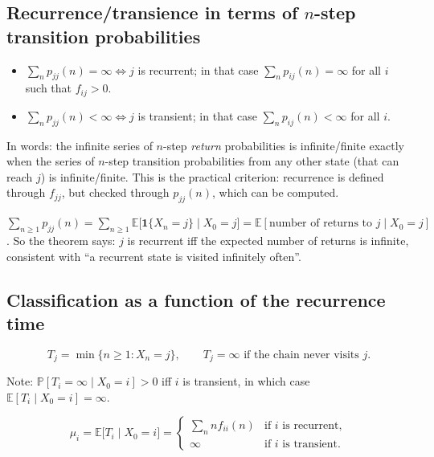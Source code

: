 \subsection{Recurrence/transience in terms of $n$-step transition probabilities}

\begin{theorem}
\begin{itemize}
    \item $\sum_n p_{jj}(n) = \infty \iff j$ is recurrent; in that case $\sum_n p_{ij}(n) = \infty$ for all $i$ such that $f_{ij} > 0$.
    \item $\sum_n p_{jj}(n) < \infty \iff j$ is transient; in that case $\sum_n p_{ij}(n) < \infty$ for all $i$.
\end{itemize}
\end{theorem}

In words: the infinite series of $n$-step \emph{return} probabilities is infinite/finite exactly when the series of $n$-step transition probabilities from any other state (that can reach $j$) is infinite/finite. This is the practical criterion: recurrence is defined through $f_{jj}$, but checked through $p_{jj}(n)$, which can be computed.

\begin{remark}[Interpretation]
$\sum_{n\geq1} p_{jj}(n) = \sum_{n \geq 1}\mathbb{E}\big[\mathbf{1}\{X_n = j\} \mid X_0 = j\big] = \mathbb{E}[\text{number of returns to } j \mid X_0 = j]$. So the theorem says: $j$ is recurrent iff the expected number of returns is infinite, consistent with ``a recurrent state is visited infinitely often''.
\end{remark}

\subsection{Classification as a function of the recurrence time}

\begin{definition}
\[
T_j = \min\{n \geq 1 : X_n = j\}, \qquad T_j = \infty \text{ if the chain never visits } j.
\]
\end{definition}

Note: $\mathbb{P}[T_i = \infty \mid X_0 = i] > 0$ iff $i$ is transient, in which case $\mathbb{E}[T_i \mid X_0 = i] = \infty$.

\begin{definition}
\[
\mu_i = \mathbb{E}\big[T_i \mid X_0 = i\big] = \begin{cases} \sum_n n f_{ii}(n) & \text{if } i \text{ is recurrent}, \\ \infty & \text{if } i \text{ is transient.} \end{cases}
\]
\end{definition}

